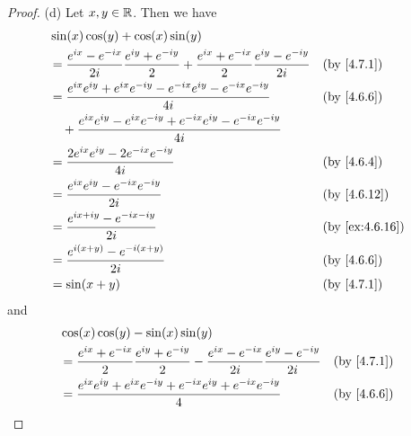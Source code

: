 \begin{proof}{(d)}
  Let \(x, y \in \mathbb{R}\).
  Then we have
  \begin{align*}
     & \sin(x) \cos(y) + \cos(x) \sin(y)                                                                                                                      \\
     & = \dfrac{e^{i x} - e^{- i x}}{2 i} \dfrac{e^{i y} + e^{- i y}}{2} + \dfrac{e^{i x} + e^{- i x}}{2} \dfrac{e^{i y} - e^{- i y}}{2i} &  & \by{4.7.1}     \\
     & = \dfrac{e^{i x} e^{i y} + e^{i x} e^{- i y} - e^{- i x} e^{i y} - e^{- i x} e^{- i y}}{4i}                                        &  & \by{4.6.6}     \\
     & \quad + \dfrac{e^{i x} e^{i y} - e^{i x} e^{- i y} + e^{- i x} e^{i y} - e^{- i x} e^{- i y}}{4i}                                                      \\
     & = \dfrac{2 e^{i x} e^{i y} - 2 e^{- i x} e^{- i y}}{4i}                                                                            &  & \by{4.6.4}     \\
     & = \dfrac{e^{i x} e^{i y} - e^{- i x} e^{- i y}}{2i}                                                                                &  & \by{4.6.12}    \\
     & = \dfrac{e^{i x + i y} - e^{- i x - i y}}{2i}                                                                                      &  & \by{ex:4.6.16} \\
     & = \dfrac{e^{i (x + y)} - e^{- i (x + y)}}{2i}                                                                                      &  & \by{4.6.6}     \\
     & = \sin(x + y)                                                                                                                      &  & \by{4.7.1}
  \end{align*}
  and
  \begin{align*}
     & \cos(x) \cos(y) - \sin(x) \sin(y)                                                                                                                     \\
     & = \dfrac{e^{i x} + e^{- i x}}{2} \dfrac{e^{i y} + e^{- i y}}{2} - \dfrac{e^{i x} - e^{- i x}}{2i} \dfrac{e^{i y} - e^{- i y}}{2i} &  & \by{4.7.1}     \\
     & = \dfrac{e^{i x} e^{i y} + e^{i x} e^{- i y} + e^{- i x} e^{i y} + e^{- i x} e^{- i y}}{4}                                        &  & \by{4.6.6}     \\

\end{align*}
\end{proof}
